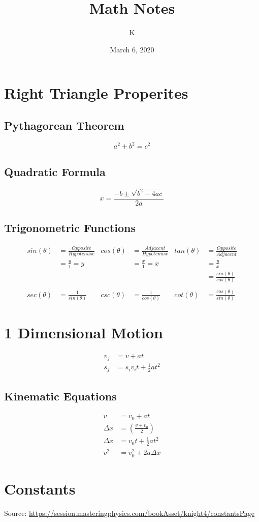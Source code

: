 \documentclass[12pt, letterpaper]{article}
\title{Math Notes}
\author{K}
\date{March 6, 2020}
\begin{document}
\maketitle
\tableofcontents{}
\pagebreak

\section{Right Triangle Properites}
\subsection{Pythagorean Theorem}
\begin{equation*}
  a^2 + b^2 = c^2
\end{equation*}

\subsection{Quadratic Formula}
\begin{equation*}
  x = \frac{-b \pm \sqrt{b^2 - 4ac}}{2a}
\end{equation*}

\subsection{Trigonometric Functions}
\begin{align*}
  sin(\theta) &= \frac{Opposite}{Hypotenuse}&
    cos(\theta) &= \frac{Adjacent}{Hypotenuse}&
    tan(\theta) &= \frac{Opposite}{Adjacent}\\
  &= \frac{y}{1} = y&
    &= \frac{x}{1} = x&
    &= \frac{y}{x}\\
  &&
    &&
    &= \frac{sin(\theta)}{cos(\theta)}\\
    \\
  sec(\theta) &= \frac{1}{sin(\theta)}&
    csc(\theta) &= \frac{1}{cos(\theta)}&
    cot(\theta) &= \frac{cos(\theta)}{sin(\theta)}
\end{align*}

\section{1 Dimensional Motion}
\begin{align*}
  v_f &= v + at\\
  s_f &= s_i v_i t + \frac{1}{2} a t^2
\end{align*}

\subsection{Kinematic Equations}
\begin{align*}
  v &= v_0 +at\\
  \Delta x &= \left( \frac{v+v_0}{2} \right)\\
  \Delta x &= v_0 t + \frac{1}{2} a t^2\\
  v^2 &= v_0^2 + 2a\Delta x
\end{align*}

\section{Constants}
Source: \url{https://session.masteringphysics.com/bookAsset/knight4/constantsPage}
\end{document}
